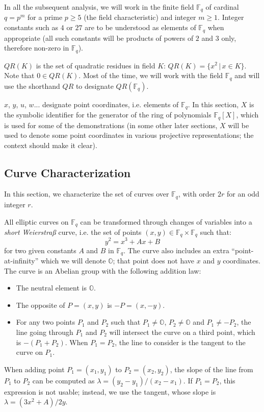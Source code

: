 \documentclass{llncs}
\newcommand{\QR}{QR}
\newcommand{\bF}{\mathbb{F}}
\newcommand{\neutral}{\mathbb{O}}
\begin{document}
In all the subsequent analysis, we will work in the finite field $\bF_q$
of cardinal $q = p^m$ for a prime $p \geq 5$ (the field characteristic)
and integer $m\geq 1$. Integer constants such as $4$ or $27$ are to be
understood as elements of $\bF_q$ when appropriate (all such constants
will be products of powers of $2$ and $3$ only, therefore non-zero in
$\bF_q$).

$\QR(K)$ is the set of quadratic residues in field $K$: $\QR(K) = \{ x^2
\,|\, x \in K \} $. Note that $0 \in \QR(K)$. Most of the time, we will
work with the field $\bF_q$ and will use the shorthand $\QR$ to designate
$\QR(\bF_q)$.

$x$, $y$, $u$, $w$... designate point coordinates, i.e. elements of
$\bF_q$. In this section, $X$ is the symbolic identifier for the
generator of the ring of polynomials $\bF_q[X]$, which is used for some
of the demonstrations (in some other later sections, $X$ will be used
to denote some point coordinates in various projective representations;
the context should make it clear).

\subsection{Curve Characterization}\label{sec:structure:characterization}

In this section, we characterize the set of curves over $\bF_q$, with
order $2r$ for an odd integer $r$.

All elliptic curves on $\bF_q$ can be transformed through changes of
variables into a \emph{short Weierstraß} curve, i.e. the set of points
$(x, y) \in \bF_q\times\bF_q$ such that:
    $$ y^2 = x^3 + Ax + B $$
for two given constants $A$ and $B$ in $\bF_q$. The curve also includes
an extra ``point-at-infinity'' which we will denote $\neutral$; that
point does not have $x$ and $y$ coordinates. The curve is an Abelian
group with the following addition law:
\begin{itemize}

    \item The neutral element is $\neutral$.

    \item The opposite of $P = (x, y)$ is $-P = (x, -y)$.

    \item For any two points $P_1$ and $P_2$ such that $P_1 \neq
    \neutral$, $P_2 \neq \neutral$ and $P_1 \neq -P_2$, the line going
    through $P_1$ and $P_2$ will intersect the curve on a third point,
    which is $-(P_1+P_2)$. When $P_1 = P_2$, the line to consider is
    the tangent to the curve on $P_1$.

\end{itemize}
When adding point $P_1 = (x_1, y_1)$ to $P_2 = (x_2, y_2)$, the slope of
the line from $P_1$ to $P_2$ can be computed as $\lambda = (y_2 - y_1) /
(x_2 - x_1)$. If $P_1 = P_2$, this expression is not usable; instead, we
use the tangent, whose slope is $\lambda = (3x^2 + A) / 2y$.
\end{document}
